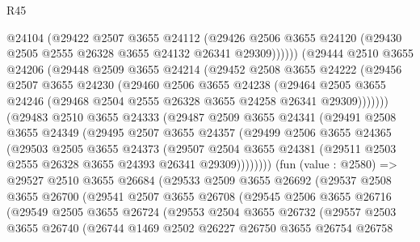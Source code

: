 \begin{lexlean}{R45}
\begin{coremodule}
              @24104
              (@29422
                @2507
                @3655
                @24112
                (@29426
                  @2506
                  @3655
                  @24120
                  (@29430 @2505 @2555 @26328 @3655 @24132 @26341 @29309))))))
        (@29444
          @2510
          @3655
          @24206
          (@29448
            @2509
            @3655
            @24214
            (@29452
              @2508
              @3655
              @24222
              (@29456
                @2507
                @3655
                @24230
                (@29460
                  @2506
                  @3655
                  @24238
                  (@29464
                    @2505
                    @3655
                    @24246
                    (@29468 @2504 @2555 @26328 @3655 @24258 @26341 @29309)))))))
        (@29483
          @2510
          @3655
          @24333
          (@29487
            @2509
            @3655
            @24341
            (@29491
              @2508
              @3655
              @24349
              (@29495
                @2507
                @3655
                @24357
                (@29499
                  @2506
                  @3655
                  @24365
                  (@29503
                    @2505
                    @3655
                    @24373
                    (@29507
                      @2504
                      @3655
                      @24381
                      (@29511 @2503 @2555 @26328 @3655 @24393 @26341 @29309))))))))
        (fun (value : @2580) =>
        @29527
          @2510
          @3655
          @26684
          (@29533
            @2509
            @3655
            @26692
            (@29537
              @2508
              @3655
              @26700
              (@29541
                @2507
                @3655
                @26708
                (@29545
                  @2506
                  @3655
                  @26716
                  (@29549
                    @2505
                    @3655
                    @26724
                    (@29553
                      @2504
                      @3655
                      @26732
                      (@29557
                        @2503
                        @3655
                        @26740
                        (@26744
                          @1469
                          @2502
                          @26227
                          @26750
                          @3655
                          @26754
                          @26758

\end{coremodule}
\end{lexlean}
